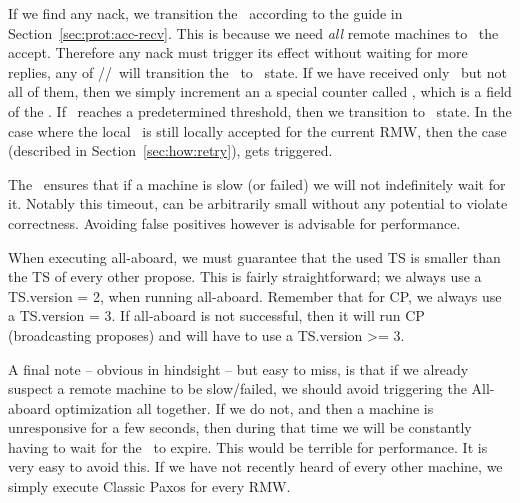If we find any nack, we transition the \locentry~according to the guide in Section~\ref{sec:prot:acc-recv}. This is because we need \emph{all} remote machines to \ack~the accept. Therefore any nack must trigger its effect without waiting for more replies, \eg any of \highprop/\highacc/\loghigh~will transition the \locentry\ to \retry~state. 
If we have received only \acks~but not all of them, then we simply increment an a special counter called \allabtimeout, which is a field of the \locentry.
If \allabtimeout~reaches a predetermined threshold, then we transition to \retry~state. 
In the case where the local \kv~is still locally accepted for the current RMW, then the  case (described in Section~\ref{sec:how:retry}), gets triggered.


The \allabtimeout~ensures that if a machine is slow (or failed) we will not indefinitely wait for it. Notably this timeout, can be arbitrarily small without any potential to violate correctness. Avoiding false positives however is advisable for performance.


\custvspace
{}
When executing all-aboard, we must guarantee that the used TS is smaller than the TS of every other propose. This is fairly straightforward; we always use a TS.version = 2, when running all-aboard. Remember that for CP, we always use a TS.version = 3. If all-aboard is not successful, then it will run CP (broadcasting proposes) and will have to use a TS.version >= 3. 

\custvspace
{}
A final note -- obvious in hindsight -- but easy to miss, is that if we already suspect a remote machine to be slow/failed, we should avoid triggering the All-aboard optimization all together.
If we do not, and then a machine is unresponsive for a few seconds, then during that time we will be constantly having to wait for the \allabtimeout~to expire. This would be terrible for performance. It is very easy to avoid this. If we have not recently heard of every other machine, we simply execute Classic Paxos for every RMW.



